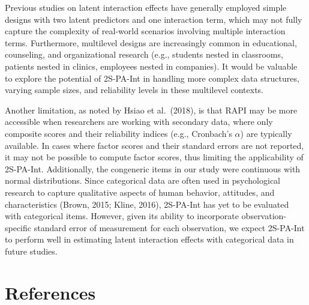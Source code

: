 \documentclass[
  man]{apa6}
\begin{document}
Previous studies on latent interaction effects have generally employed simple designs with two latent predictors and one interaction term, which may not fully capture the complexity of real-world scenarios involving multiple interaction terms. Furthermore, multilevel designs are increasingly common in educational, counseling, and organizational research (e.g., students nested in classrooms, patients nested in clinics, employees nested in companies). It would be valuable to explore the potential of 2S-PA-Int in handling more complex data structures, varying sample sizes, and reliability levels in these multilevel contexts.

Another limitation, as noted by Hsiao et al.~(2018), is that RAPI may be more accessible when researchers are working with secondary data, where only composite scores and their reliability indices (e.g., Cronbach's \(\alpha\)) are typically available. In cases where factor scores and their standard errors are not reported, it may not be possible to compute factor scores, thus limiting the applicability of 2S-PA-Int. Additionally, the congeneric items in our study were continuous with normal distributions. Since categorical data are often used in psychological research to capture qualitative aspects of human behavior, attitudes, and characteristics (Brown, 2015; Kline, 2016), 2S-PA-Int has yet to be evaluated with categorical items. However, given its ability to incorporate observation-specific standard error of measurement for each observation, we expect 2S-PA-Int to perform well in estimating latent interaction effects with categorical data in future studies.

\newpage

\section{References}\label{references}
\end{document}
